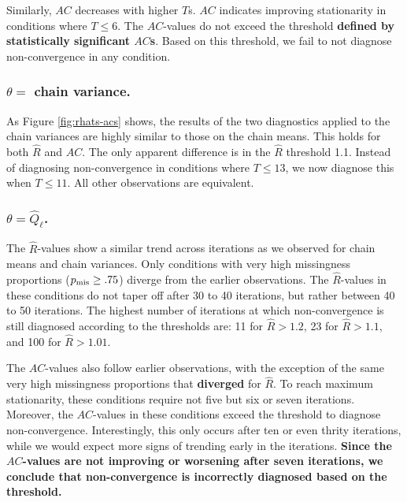 \documentclass[Royal,times,sageh]{sagej}
\begin{document}
Similarly, \(AC\) decreases with higher \(T\)s. \(AC\) indicates improving stationarity in conditions where \(T\leq6\). The \(AC\)-values do not exceed the threshold \textbf{defined by statistically significant \(AC\)s}. Based on this threshold, we fail to not diagnose non-convergence in any condition.

\hypertarget{theta-chain-variance.}{%
\subsubsection{\texorpdfstring{\(\theta=\) chain variance.}{\textbackslash theta= chain variance.}}\label{theta-chain-variance.}}

As Figure \ref{fig:rhats-acs} shows, the results of the two diagnostics applied to the chain variances are highly similar to those on the chain means. This holds for both \(\widehat{R}\) and \(AC\). The only apparent difference is in the \(\widehat{R}\) threshold 1.1. Instead of diagnosing non-convergence in conditions where \(T\leq13\), we now diagnose this when \(T\leq11\). All other observations are equivalent.

\hypertarget{thetahatq_ell.}{%
\subsubsection{\texorpdfstring{\(\theta=\hat{Q}_\ell\).}{\textbackslash theta=\textbackslash hat\{Q\}\_\textbackslash ell.}}\label{thetahatq_ell.}}

The \(\widehat{R}\)-values show a similar trend across iterations as we observed for chain means and chain variances. Only conditions with very high missingness proportions (\(p_{\rm mis}\geq.75\)) diverge from the earlier observations. The \(\widehat{R}\)-values in these conditions do not taper off after 30 to 40 iterations, but rather between 40 to 50 iterations. The highest number of iterations at which non-convergence is still diagnosed according to the thresholds are: 11 for \(\widehat{R}>1.2\), 23 for \(\widehat{R}>1.1\), and 100 for \(\widehat{R}>1.01\).

The \(AC\)-values also follow earlier observations, with the exception of the same very high missingness proportions that \textbf{diverged} for \(\widehat{R}\). To reach maximum stationarity, these conditions require not five but six or seven iterations. Moreover, the \(AC\)-values in these conditions exceed the threshold to diagnose non-convergence. Interestingly, this only occurs after ten or even thrity iterations, while we would expect more signs of trending early in the iterations. \textbf{Since the \(AC\)-values are not improving or worsening after seven iterations, we conclude that non-convergence is incorrectly diagnosed based on the threshold.}
\end{document}
